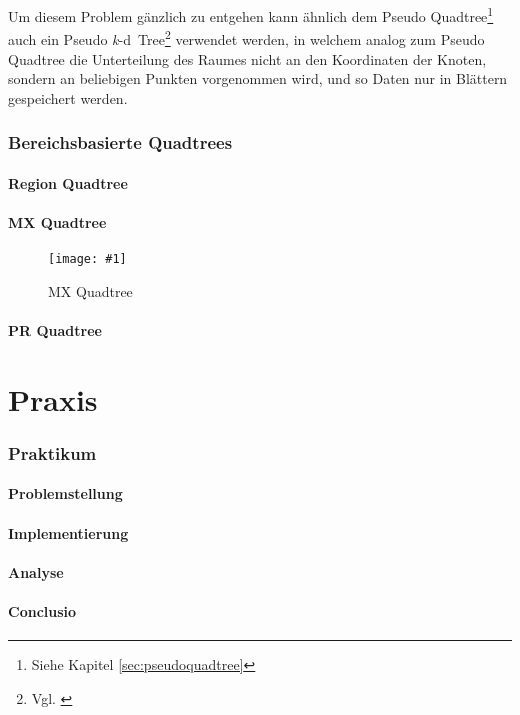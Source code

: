 \documentclass[%
			paper=a4,%
			DIV12,
			draft=false,%
			titlepage
			]{scrartcl}
\newcommand{\zitx}[2]{#1 \cite{#2}}
\newcommand{\footzitx}[2]{\footnote{\zitx{#1}{#2}}}
\newcommand{\kd}{\mbox{\textit{k}-d}}
\newcommand{\myfig}[4] {
 \begin{figure}[tbph]
	 \centering
	 \texttt{[image: \#1]}
	 \caption{#4}
	 \label{fig:#2}
 \end{figure}
}
\begin{document}
Um diesem Problem gänzlich zu entgehen kann ähnlich dem Pseudo Quadtree\footnote{Siehe Kapitel \ref{sec:pseudoquadtree}} auch ein Pseudo \kd\ Tree\footzitx{Vgl.}{DBLP:journals/acta/OvermarsL82} verwendet werden,
in welchem analog zum Pseudo Quadtree die Unterteilung des Raumes nicht an den Koordinaten der Knoten, sondern an beliebigen Punkten vorgenommen wird, und so Daten nur in Blättern gespeichert werden.



%


\section{Bereichsbasierte Quadtrees}
\subsection{Region Quadtree}

\subsection{MX Quadtree}
\myfig{img/mxquadtre-full-trimmed}{mxquadtree}{width=.7\textwidth}{MX Quadtree}


\subsection{PR Quadtree}

\part{Praxis}

\section{Praktikum}

\subsection{Problemstellung}

\subsection{Implementierung}

\subsection{Analyse}

\subsection{Conclusio}

\newpage

\nocite{*} %

\end{document}
